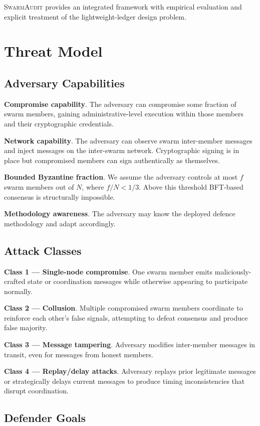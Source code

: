 \documentclass[sigconf,nonacm]{acmart}
\begin{document}
\textsc{SwarmAudit} provides an integrated framework with
empirical evaluation and explicit treatment of the lightweight-ledger
design problem.

\section{Threat Model}

\subsection{Adversary Capabilities}

\textbf{Compromise capability}. The adversary can compromise some
fraction of swarm members, gaining administrative-level execution
within those members and their cryptographic credentials.

\textbf{Network capability}. The adversary can observe swarm
inter-member messages and inject messages on the inter-swarm
network. Cryptographic signing is in place but compromised members
can sign authentically as themselves.

\textbf{Bounded Byzantine fraction}. We assume the adversary
controls at most $f$ swarm members out of $N$, where
$f/N < 1/3$. Above this threshold BFT-based consensus is
structurally impossible.

\textbf{Methodology awareness}. The adversary may know the
deployed defence methodology and adapt accordingly.

\subsection{Attack Classes}

\textbf{Class 1 --- Single-node compromise}. One swarm member
emits maliciously-crafted state or coordination messages while
otherwise appearing to participate normally.

\textbf{Class 2 --- Collusion}. Multiple compromised swarm members
coordinate to reinforce each other's false signals, attempting to
defeat consensus and produce false majority.

\textbf{Class 3 --- Message tampering}. Adversary modifies
inter-member messages in transit, even for messages from honest
members.

\textbf{Class 4 --- Replay/delay attacks}. Adversary replays prior
legitimate messages or strategically delays current messages to
produce timing inconsistencies that disrupt coordination.

\subsection{Defender Goals}
\end{document}
